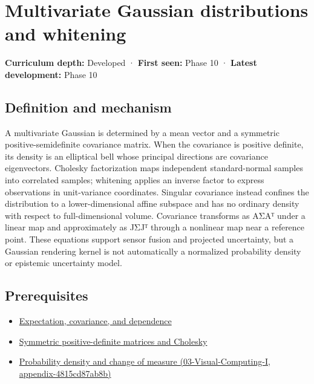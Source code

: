 \hypertarget{appendix-12bbe185dbe5}{}
\section{Multivariate Gaussian distributions and whitening}\label{appendix-12bbe185dbe5-multivariate-gaussian-distributions-and-whitening}

\textbf{Curriculum depth:} Developed · \textbf{First seen:} Phase 10 · \textbf{Latest development:} Phase 10

\subsection{Definition and mechanism}\label{appendix-12bbe185dbe5-definition-and-mechanism}

A multivariate Gaussian is determined by a mean vector and a symmetric positive-semidefinite covariance matrix. When the covariance is positive definite, its density is an elliptical bell whose principal directions are covariance eigenvectors. Cholesky factorization maps independent standard-normal samples into correlated samples; whitening applies an inverse factor to express observations in unit-variance coordinates. Singular covariance instead confines the distribution to a lower-dimensional affine subspace and has no ordinary density with respect to full-dimensional volume. Covariance transforms as AΣAᵀ under a linear map and approximately as JΣJᵀ through a nonlinear map near a reference point. These equations support sensor fusion and projected uncertainty, but a Gaussian rendering kernel is not automatically a normalized probability density or epistemic uncertainty model.

\subsection{Prerequisites}\label{appendix-12bbe185dbe5-prerequisites}

\begin{itemize}
\tightlist
\item
  \hyperref[appendix-54c383df9992]{Expectation, covariance, and dependence}
\item
  \hyperref[appendix-50d2ea3c9b26]{Symmetric positive-definite matrices and Cholesky}
\item
  \href{../03-Visual-Computing-I/main.pdf\#nameddest=appendix-4815cd87ab8b}{Probability density and change of measure (03-Visual-Computing-I, appendix-4815cd87ab8b)}
\end{itemize}


